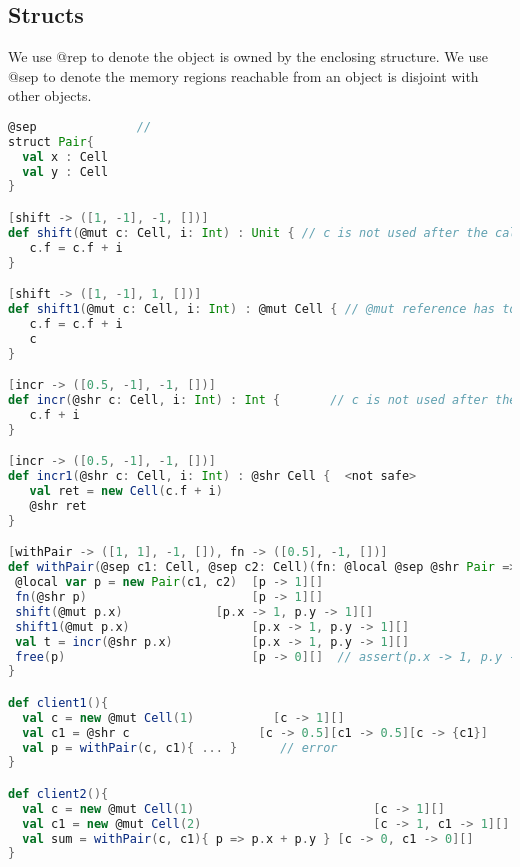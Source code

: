 \clearpage

\subsection{Structs}

\cite{haller2010capabilities}
We use @rep to denote the object is owned by the enclosing structure.
We use @sep to denote the memory regions reachable from an object is disjoint with other objects.

\begin{lstlisting}[language=Scala,basicstyle=\footnotesize\ttfamily]
@sep              //
struct Pair{
  val x : Cell
  val y : Cell
}

[shift -> ([1, -1], -1, [])]
def shift(@mut c: Cell, i: Int) : Unit { // c is not used after the call to shift
   c.f = c.f + i      
}

[shift -> ([1, -1], 1, [])]
def shift1(@mut c: Cell, i: Int) : @mut Cell { // @mut reference has to be returned
   c.f = c.f + i
   c      
}

[incr -> ([0.5, -1], -1, [])]
def incr(@shr c: Cell, i: Int) : Int {       // c is not used after the call to shift
   c.f + i        
}

[incr -> ([0.5, -1], -1, [])]
def incr1(@shr c: Cell, i: Int) : @shr Cell {  <not safe>
   val ret = new Cell(c.f + i)
   @shr ret
}

[withPair -> ([1, 1], -1, []), fn -> ([0.5], -1, [])]
def withPair(@sep c1: Cell, @sep c2: Cell)(fn: @local @sep @shr Pair => Int) : Int {
 @local var p = new Pair(c1, c2)  [p -> 1][]
 fn(@shr p)                       [p -> 1][]                     
 shift(@mut p.x)             [p.x -> 1, p.y -> 1][]
 shift1(@mut p.x)                 [p.x -> 1, p.y -> 1][]
 val t = incr(@shr p.x)           [p.x -> 1, p.y -> 1][]
 free(p)                          [p -> 0][]  // assert(p.x -> 1, p.y -> 1)
}

def client1(){
  val c = new @mut Cell(1)           [c -> 1][] 
  val c1 = @shr c                  [c -> 0.5][c1 -> 0.5][c -> {c1}]
  val p = withPair(c, c1){ ... }      // error   
}

def client2(){
  val c = new @mut Cell(1)                         [c -> 1][] 
  val c1 = new @mut Cell(2)                        [c -> 1, c1 -> 1][] 
  val sum = withPair(c, c1){ p => p.x + p.y } [c -> 0, c1 -> 0][]       
}

\end{lstlisting}

